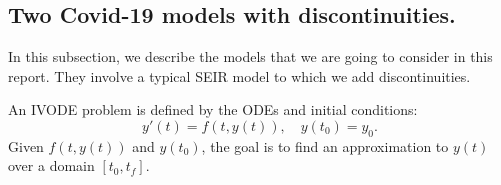 

\subsection{Two Covid-19 models with discontinuities.} 
\label{subsection:SEIR_model}
In this subsection, we describe the models that we are going to consider in this report. They involve a typical SEIR model to which we add discontinuities.

An IVODE problem is defined by the ODEs and initial conditions:
\begin{equation}
y'(t) = f(t, y(t)), \quad y(t_0) = y_0. \nonumber
\end{equation}
Given $f(t, y(t))$ and $y(t_0)$, the goal is to find an approximation to  $y(t)$ over a domain $[t_0, t_f]$. 

